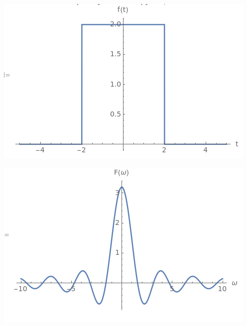 \documentclass[a4paper,12pt]{article}
\begin{document}
\begin{center}
\begin{minipage}{0.48\textwidth}
  \centering
  \includegraphics[width=\linewidth]{images/1f22.png}
\end{minipage}
\hfill
\begin{minipage}{0.48\textwidth}
  \centering
  \includegraphics[width=\linewidth]{images/1F22.png}
\end{minipage}
\end{center}
\end{document}

